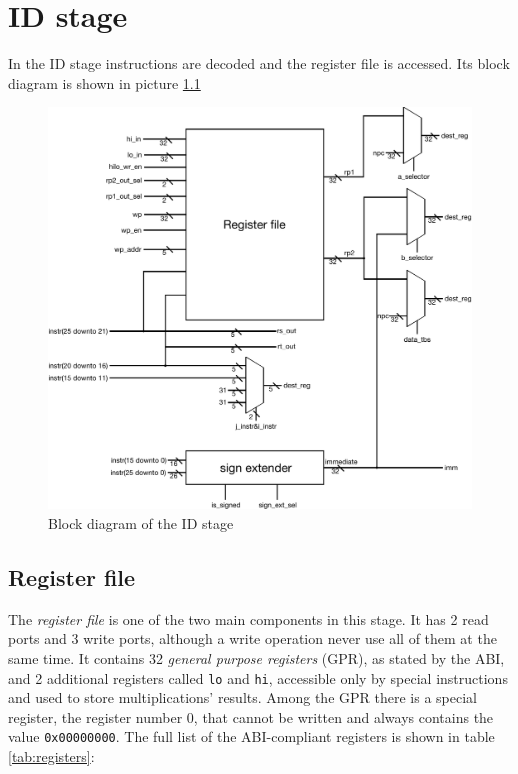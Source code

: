 \chapter{ID stage}
\label{chap:id}

In the ID stage instructions are decoded and the register file is accessed. Its block diagram is shown in picture \ref{fig:ID_stage}

\begin{figure}[!ht]
	\centering
	\includegraphics[width=.6\linewidth]{./chapters/figures/ID_stage.pdf}
	\caption{Block diagram of the ID stage}
	\label{fig:ID_stage}
\end{figure}

\section{Register file}

The {\it register file} is one of the two main components in this stage. It has 2 read ports and 3 write ports, although a write operation never use all of them at the same time.
It contains 32 {\it general purpose registers} (GPR), as stated by the ABI, and 2 additional registers called \verb|lo| and \verb|hi|, accessible only by special instructions and used
to store multiplications' results. Among the GPR there is a special register, the register number 0, that cannot be written and always contains the value \verb|0x00000000|.
The full list of the ABI-compliant registers is shown in table \ref{tab:registers}:

